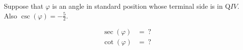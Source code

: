 Suppose that $\varphi$ is an angle in standard position whose terminal side is in Q$IV$. Also $\csc(\varphi) = -\frac{5}{2}$.

$$
\begin{align*}
  \sec(\varphi) &=\ ? \\
  \cot(\varphi) &=\ ? \\
\end{align*}
$$
